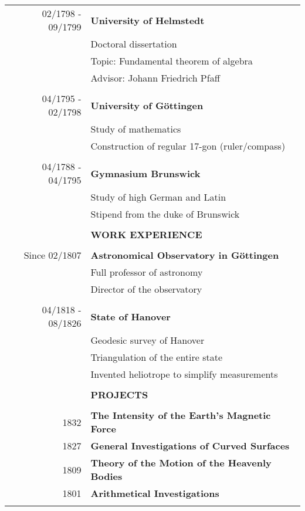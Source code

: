 \documentclass[11pt]{article}
\newcommand{\largespace}{\\[2pt]}
\newcommand{\mediumspace}{\\[-3pt]}
\newcommand{\smallspace}{\\[-5pt]}
\newcommand{\titlefont}[1]{\uppercase{\textbf{\large{#1}}}}
\begin{document}
\begin{tcbposter}[
    poster = {columns=1, rows=1, spacing=0pt},
    boxes = {sharp corners, halign=center, valign=center, boxrule=0pt}
]
{\begin{tabular}{>{\footnotesize}rl}
        02/1798 - 09/1799
            & \textbf{University of Helmstedt} \\
            & Doctoral dissertation \\
            & Topic: Fundamental theorem of algebra \\
            & Advisor: Johann Friedrich Pfaff \\
            & \smallspace

        04/1795 - 02/1798
            & \textbf{University of Göttingen} \\
            & Study of mathematics \\
            & Construction of regular 17-gon (ruler/compass) \\
            & \smallspace

        04/1788 - 04/1795
            & \textbf{Gymnasium Brunswick}\\
            & Study of high German and Latin \\
            & Stipend from the duke of Brunswick \\
            & \largespace

        & \titlefont{\faChartPie\enspace Work experience} \\
        \hline \mediumspace

        Since 02/1807
            & \textbf{Astronomical Observatory in Göttingen} \\
            & Full professor of astronomy \\
            & Director of the observatory \\
            & \smallspace

        04/1818 - 08/1826
            & \textbf{State of Hanover} \\
            & Geodesic survey of Hanover \\
            & Triangulation of the entire state \\
            & Invented heliotrope to simplify measurements \\ 
            & \largespace

        & \titlefont{\faFlask\enspace Projects} \\
        \hline \mediumspace
        1832
            & \textbf{The Intensity of the Earth's Magnetic Force} \\
        1827
            & \textbf{General Investigations of Curved Surfaces} \\
        1809
            & \textbf{Theory of the Motion of the Heavenly Bodies} \\
        1801
            & \textbf{Arithmetical Investigations} \\
            & \largespace


\end{tabular}}
\end{tcbposter}
\end{document}
